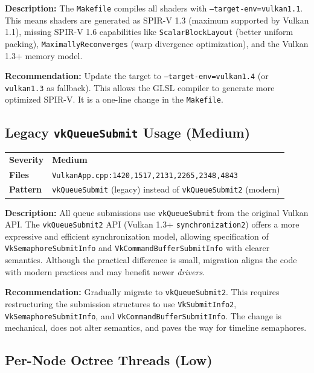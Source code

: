 \documentclass[a4paper,10pt]{article}
\newcommand{\severity}[1]{%
  \ifstrequal{#1}{Critical}{\textcolor{high}{\textbf{#1}}}{%
  \ifstrequal{#1}{High}{\textcolor{high}{\textbf{#1}}}{%
  \ifstrequal{#1}{Medium}{\textcolor{medium}{\textbf{#1}}}{%
  \ifstrequal{#1}{Low}{\textcolor{low}{\textbf{#1}}}{#1}}}}}
\begin{document}
\vspace{0.5em}
\noindent
\textbf{Description:} The \texttt{Makefile} compiles all shaders with
\texttt{--target-env=vulkan1.1}. This means shaders are generated as
SPIR-V 1.3 (maximum supported by Vulkan 1.1), missing SPIR-V 1.6 capabilities
like \texttt{ScalarBlockLayout} (better uniform packing),
\texttt{MaximallyReconverges} (warp divergence optimization), and the
Vulkan 1.3+ memory model.

\noindent\textbf{Recommendation:} Update the target to
\texttt{--target-env=vulkan1.4} (or \texttt{vulkan1.3} as fallback). This
allows the GLSL compiler to generate more optimized SPIR-V. It is a one-line
change in the \texttt{Makefile}.

\subsection{Legacy \texttt{vkQueueSubmit} Usage (Medium)}

\begin{tabular}{ll}
    \textbf{Severity} & \severity{Medium} \\
    \textbf{Files}     & \texttt{VulkanApp.cpp:1420,1517,2131,2265,2348,4843} \\
    \textbf{Pattern}   & \texttt{vkQueueSubmit} (legacy) instead of
                          \texttt{vkQueueSubmit2} (modern) \\
\end{tabular}

\vspace{0.5em}
\noindent
\textbf{Description:} All queue submissions use \texttt{vkQueueSubmit} from the
original Vulkan API. The \texttt{vkQueueSubmit2} API (Vulkan 1.3+
\texttt{synchronization2}) offers a more expressive and efficient
synchronization model, allowing specification of \texttt{VkSemaphoreSubmitInfo}
and \texttt{VkCommandBufferSubmitInfo} with clearer semantics. Although the
practical difference is small, migration aligns the code with modern practices
and may benefit newer \textit{drivers}.

\noindent\textbf{Recommendation:} Gradually migrate to
\texttt{vkQueueSubmit2}. This requires restructuring the submission
structures to use \texttt{VkSubmitInfo2}, \texttt{VkSemaphoreSubmitInfo}, and
\texttt{VkCommandBufferSubmitInfo}. The change is mechanical, does not alter
semantics, and paves the way for timeline semaphores.

\subsection{Per-Node Octree Threads (Low)}
\end{document}
